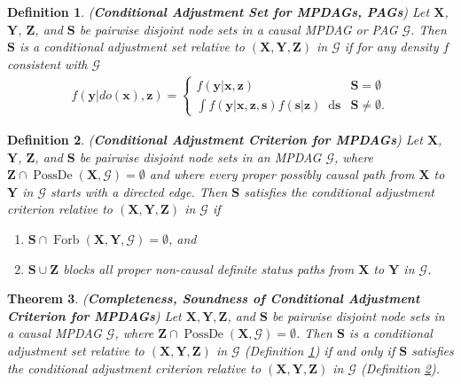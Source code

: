 \documentclass[twoside]{article}
\newtheorem{theorem}{Theorem}
\newtheorem{definition}[theorem]{Definition}
\DeclareMathOperator{\PossDe}{PossDe}
\DeclareMathOperator{\Forb}{Forb}
\newcommand{\fb}[2][X,Y]{\Forb(\mb{#1},#2)}
\newcommand{\mb}[1]{\mathbf{#1}}
\newcommand{\g}[1][G]{\mathcal{#1}}
\newcommand*\diff{\mathop{}\!\mathrm{d}}
\begin{document}
\begin{definition}
\label{def:cas}
{\normalfont (\textbf{Conditional Adjustment Set for MPDAGs, PAGs})}
    Let $\mb{X}$, $\mb{Y}$, $\mb{Z}$, and $\mb{S}$ be pairwise disjoint node sets in a causal MPDAG or PAG $\g$. Then $\mb{S}$ is a conditional adjustment set relative to $(\mb{X},\mb{Y},\mb{Z})$ in $\g$ if for any density $f$ consistent with $\g$ 
    \begin{align}
        f(\mb{y}|do(\mb{x}), \mb{z}) = 
        \begin{cases} 
            f(\mb{y} | \mb{x}, \mb{z}) & \mb{S}=\emptyset \\
            \int f(\mb{y} | \mb{x}, \mb{z}, \mb{s}) f(\mb{s}|\mb{z}) \diff \mb{s} & \mb{S}\neq\emptyset.
        \end{cases}
    \end{align}
\end{definition}


\begin{definition}
\label{def:cac}
{\normalfont (\textbf{Conditional Adjustment Criterion for MPDAGs})}
    Let $\mb{X}$, $\mb{Y}$, $\mb{Z}$, and $\mb{S}$ be pairwise disjoint node sets in an MPDAG $\g$, where $\mb{Z} \cap \PossDe(\mb{X},\g) = \emptyset$ and where every proper possibly causal path from $\mb{X}$ to $\mb{Y}$ in $\g$ starts with a directed edge. Then $\mb{S}$ satisfies the conditional adjustment criterion relative to $(\mb{X},\mb{Y},\mb{Z})$ in $\g$ if 
    \begin{enumerate}[label=\emph{(\alph*)}]
        \item $\mb{S} \cap \fb{\g} = \emptyset$, and \label{def:cac-a}
        \item $\mb{S} \cup \mb{Z}$ blocks all proper non-causal definite status paths from $\mb{X}$ to $\mb{Y}$ in $\g$. \label{def:cac-b}
    \end{enumerate}
\end{definition}


\begin{theorem}
\label{thm:cac-cas}
{\normalfont (\textbf{Completeness, Soundness of Conditional Adjustment Criterion for MPDAGs})}
    Let $\mb{X,Y}, \mb{Z}$, and $\mb{S}$ be pairwise disjoint node sets in a causal MPDAG $\g$, where $\mb{Z} \cap \PossDe(\mb{X},\g) = \emptyset$. Then $\mb{S}$ is a conditional adjustment set relative to $(\mb{X,Y,Z})$ in $\g$ (Definition \ref{def:cas}) if and only if $\mb{S}$ satisfies the conditional adjustment criterion relative to $(\mb{X,Y,Z})$ in $\g$ (Definition \ref{def:cac}).
\end{theorem}
\end{document}
